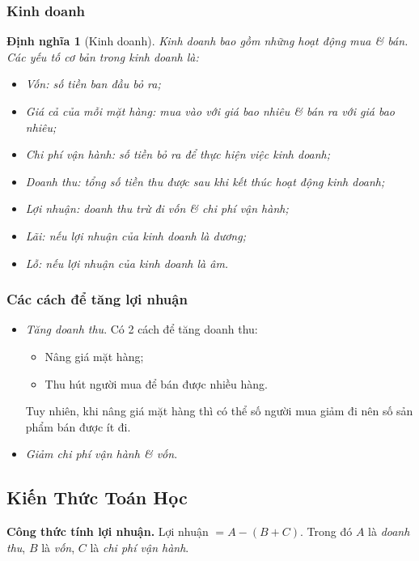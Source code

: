 \documentclass[oneside]{book}
\numberwithin{equation}{section}
\newtheorem{dinhnghia}{Định nghĩa}[section]
\begin{document}
\subsubsection{Kinh doanh}
\begin{dinhnghia}[Kinh doanh]
	\emph{Kinh doanh} bao gồm những hoạt động mua \textit{\&} bán. Các yếu tố cơ bản trong kinh doanh là:
	\begin{itemize}
		\item \emph{Vốn:} số tiền ban đầu bỏ ra;
		\item \emph{Giá cả của mỗi mặt hàng:} mua vào với giá bao nhiêu \textit{\&} bán ra với giá bao nhiêu;
		\item \emph{Chi phí vận hành:} số tiền bỏ ra để thực hiện việc kinh doanh;
		\item \emph{Doanh thu:} tổng số tiền thu được sau khi kết thúc hoạt động kinh doanh;
		\item \emph{Lợi nhuận:} doanh thu trừ đi vốn \textit{\&} chi phí vận hành;
		\item \emph{Lãi:} nếu lợi nhuận của kinh doanh là dương;
		\item \emph{Lỗ:} nếu lợi nhuận của kinh doanh là âm.
	\end{itemize}
\end{dinhnghia}

\subsubsection{Các cách để tăng lợi nhuận}
\begin{itemize}
	\item \textit{Tăng doanh thu}. Có 2 cách để tăng doanh thu:
	\begin{itemize}
		\item Nâng giá mặt hàng;
		\item Thu hút người mua để bán được nhiều hàng.
	\end{itemize}
	Tuy nhiên, khi nâng giá mặt hàng thì có thể số người mua giảm đi nên số sản phẩm bán được ít đi.
	\item \textit{Giảm chi phí vận hành \textit{\&} vốn}.
\end{itemize}

\subsection{Kiến Thức Toán Học}

\begin{tcolorbox}
	\textbf{Công thức tính lợi nhuận.} Lợi nhuận $= A - (B + C)$. Trong đó $A$ là \textit{doanh thu}, $B$ là \textit{vốn}, $C$ là \textit{chi phí vận hành}.
\end{tcolorbox}
\end{document}
